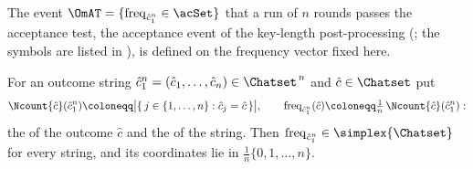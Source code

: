 
The event $\OmAT=\{\operatorname{freq}_{\hat c_1^n}\in\acSet\}$ that a run
of $n$ rounds passes the acceptance test, the acceptance event of the
key-length post-processing (; the symbols are listed in
), is defined
on the frequency vector fixed here.

\begin{definition}\label{def:freq}
For an outcome string $\hat c_1^n=(\hat c_1,\dots,\hat c_n)\in\Chatset^{\,n}$
and $\hat c\in\Chatset$ put
\begin{equation}\label{eq:freq}
  \Ncount{\hat c}(\hat c_1^n)\coloneqq
  \big|\{\,j\in\{1,\dots,n\}:\hat c_j=\hat c\,\}\big|,
  \qquad
  \operatorname{freq}_{\hat c_1^n}(\hat c)\coloneqq
  \tfrac{1}{n}\,\Ncount{\hat c}(\hat c_1^n):
\end{equation}
the  of the outcome $\hat c$ and the
 of the string. Then
$\operatorname{freq}_{\hat c_1^n}\in\simplex{\Chatset}$ for every string, and
its coordinates lie in $\tfrac1n\{0,1,\dots,n\}$.
\end{definition}
